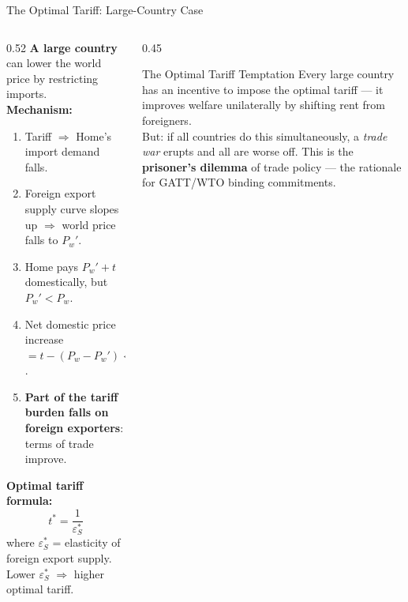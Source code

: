 \documentclass[aspectratio=169]{beamer}
\begin{document}
\begin{frame}{The Optimal Tariff: Large-Country Case}
\begin{columns}
\begin{column}{0.52\textwidth}
\textbf{A large country} can lower the world price by restricting imports.\\[0.3em]
\textbf{Mechanism:}
\begin{enumerate}
  \item Tariff $\Rightarrow$ Home's import demand falls.
  \item Foreign export supply curve slopes up $\Rightarrow$ world price falls to $P_w'$.
  \item Home pays $P_w' + t$ domestically, but $P_w' < P_w$.
  \item Net domestic price increase $= t - (P_w - P_w') < t$.
  \item \textbf{Part of the tariff burden falls on foreign exporters}: terms of trade improve.
\end{enumerate}
\textbf{Optimal tariff formula:}
\[t^* = \frac{1}{\varepsilon_S^*}\]
where $\varepsilon_S^*$ = elasticity of foreign export supply. Lower $\varepsilon_S^*$ $\Rightarrow$ higher optimal tariff.
\end{column}
\begin{column}{0.45\textwidth}
\begin{insight}{The Optimal Tariff Temptation}
  Every large country has an incentive to impose the optimal tariff --- it improves welfare unilaterally by shifting rent from foreigners.\\[0.3em]
  But: if all countries do this simultaneously, a \emph{trade war} erupts and all are worse off. This is the \textbf{prisoner's dilemma} of trade policy --- the rationale for GATT/WTO binding commitments.
\end{insight}
\end{column}
\end{columns}
\end{frame}
\end{document}

